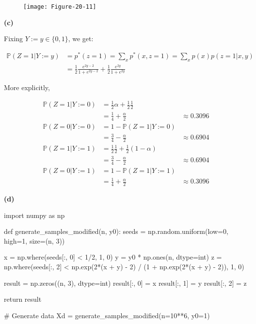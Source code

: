 \begin{figure}[H]
\texttt{[image: Figure-20-11]}
\end{figure}

\textbf{(c)}

Fixing \(Y := y \in \{0, 1\}\), we get:

\[ 
\begin{align}
\mathbb{P}(Z = 1 | Y := y) &= p^*(z = 1) = \sum_x p^*(x, z = 1) = \sum_x p(x) p(z = 1 | x, y) \\
&= \frac{1}{2} \frac{e^{2y-2}}{1 + e^{2y-2}} + \frac{1}{2} \frac{e^{2y}}{1 + e^{2y}}
\end{align}
\]

More explicitly,

\[ 
\begin{align}
\mathbb{P}(Z = 1 | Y := 0) &= \frac{1}{2} \alpha + \frac{1}{2}\frac{1}{2} \\
&= \frac{1}{4} + \frac{\alpha}{2} &\approx 0.3096 \\
\mathbb{P}(Z = 0 | Y := 0) &= 1 - \mathbb{P}(Z = 1 | Y := 0) \\
&= \frac{3}{4} - \frac{\alpha}{2} &\approx 0.6904 \\
\mathbb{P}(Z = 1 | Y := 1) &= \frac{1}{2} \frac{1}{2} + \frac{1}{2} \left( 1 - \alpha \right) \\
&= \frac{3}{4} - \frac{\alpha}{2} &\approx 0.6904 \\
\mathbb{P}(Z = 0 | Y := 1) &= 1 - \mathbb{P}(Z = 1 | Y := 1) \\
&= \frac{1}{4} + \frac{\alpha}{2} &\approx 0.3096
\end{align}
\]

\textbf{(d)}

\begin{python}
import numpy as np

def generate_samples_modified(n, y0):
    seeds = np.random.uniform(low=0, high=1, size=(n, 3))
    
    x = np.where(seeds[:, 0] < 1/2, 1, 0)
    y = y0 * np.ones(n, dtype=int)
    z = np.where(seeds[:, 2] < np.exp(2*(x + y) - 2) / (1 + np.exp(2*(x + y) - 2)), 1, 0)
    
    result = np.zeros((n, 3), dtype=int)
    result[:, 0] = x
    result[:, 1] = y
    result[:, 2] = z
    
    return result
\end{python}

\begin{python}
# Generate data
Xd = generate_samples_modified(n=10**6, y0=1)
\end{python}

